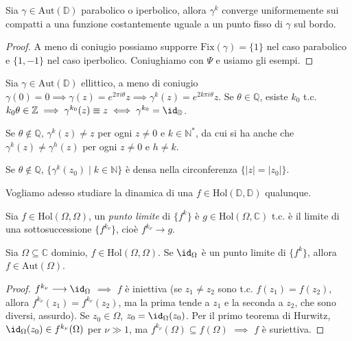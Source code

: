 \begin{cor}
  Sia $\gamma \in \text{Aut}(\mathbb{D})$ parabolico o iperbolico, allora $\gamma^k$ converge uniformemente sui compatti a una funzione costantemente uguale a un punto fisso di $\gamma$ sul bordo.
\end{cor}

\begin{proof}
  A meno di coniugio possiamo supporre $\text{Fix}(\gamma)=\{1\}$ nel caso parabolico e $\{1, -1\}$ nel caso iperbolico. Coniughiamo con $\Psi$ e usiamo gli esempi.
\end{proof}

Sia $\gamma \in \text{Aut}(\mathbb{D})$ ellittico, a meno di coniugio $\gamma(0)=0 \implies \gamma(z)=e^{2\pi i \theta}z \implies \gamma^k(z)=e^{2k\pi i \theta}z$.
Se $\theta \in \mathbb{Q}$, esiste $k_0$ t.c. $k_0\theta \in \mathbb{Z} \implies \gamma^{k_0}(z) \equiv z \iff \gamma^{k_0}=\id_{\mathbb{D}}$.

\begin{exc}
  Se $\theta \not\in \mathbb{Q}$, $\gamma^k(z) \not=z$ per ogni $z \not=0$ e $k \in \mathbb{N}^*$, da cui si ha anche che $\gamma^k(z)\not=\gamma^h(z)$ per ogni $z \not=0$ e $h \not=k$.
\end{exc}

\begin{exc}
  Se $\theta \not\in \mathbb{Q}$, $\{\gamma^k(z_0) \mid k \in \mathbb{N}\}$ è densa nella circonferenza $\{|z|=|z_0|\}$.
\end{exc}

Vogliamo adesso studiare la dinamica di una $f \in \text{Hol}(\mathbb{D}, \mathbb{D})$ qualunque.

\begin{defn}
  Sia $f \in \text{Hol}(\Omega, \Omega)$, un \textit{punto limite} di $\{f^k\}$ è $g \in \text{Hol}(\Omega, \mathbb{C})$ t.c. è il limite di una sottosuccessione $\{f^{k_{\nu}}\}$, cioè $f^{k_{\nu}} \longrightarrow g$.
\end{defn}

\begin{lm} \label{pli}
  Sia $\Omega \subseteq \mathbb{C}$ dominio, $f \in \text{Hol}(\Omega, \Omega)$. Se $\id_{\Omega}$ è un punto limite di $\{f^k\}$, allora $f \in \text{Aut}(\Omega)$.
\end{lm}

\begin{proof}
  $f^{k_{\nu}} \longrightarrow \id_{\Omega}$ $\implies$ $f$ è iniettiva (se $z_1 \not=z_2$ sono t.c. $f(z_1)=f(z_2)$, allora $f^{k_{\nu}}(z_1)=f^{k_{\nu}}(z_2)$, ma la prima tende a $z_1$ e la seconda a $z_2$, che sono diversi, assurdo).
  Se $z_0 \in \Omega$, $z_0=\id_{\Omega}(z_0)$. Per il primo teorema di Hurwitz, $\id_{\Omega}(z_0) \in f^{k_{\nu}}(\Omega)$ per $\nu \gg 1$, ma $f^{k_{\nu}}(\Omega) \subseteq f(\Omega)$ $\implies$ $f$ è suriettiva.
\end{proof}

